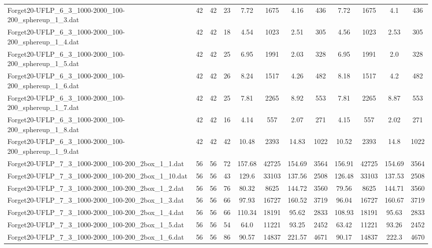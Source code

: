 \begin{sidewaystable}[!ht]
{\begin{tabular}{lccccccccccc}
Forget20-UFLP\_6\_3\_1000-2000\_100-200\_sphereup\_1\_3.dat & 42 & 42 & 23 & 7.72 & 1675 & 4.16 & 436 & 7.72 & 1675 &  \textcolor{blue2}{4.1} & 436 \\
Forget20-UFLP\_6\_3\_1000-2000\_100-200\_sphereup\_1\_4.dat & 42 & 42 & 18 & 4.54 & 1023 &  \textcolor{blue2}{2.51} & 305 & 4.56 & 1023 & 2.53 & 305 \\
Forget20-UFLP\_6\_3\_1000-2000\_100-200\_sphereup\_1\_5.dat & 42 & 42 & 25 & 6.95 & 1991 & 2.03 & 328 & 6.95 & 1991 &  \textcolor{blue2}{2.0} & 328 \\
Forget20-UFLP\_6\_3\_1000-2000\_100-200\_sphereup\_1\_6.dat & 42 & 42 & 26 & 8.24 & 1517 & 4.26 & 482 & 8.18 & 1517 &  \textcolor{blue2}{4.2} & 482 \\
Forget20-UFLP\_6\_3\_1000-2000\_100-200\_sphereup\_1\_7.dat & 42 & 42 & 25 &  \textcolor{blue2}{7.81} & 2265 & 8.92 & 553 &  \textcolor{blue2}{7.81} & 2265 & 8.87 & 553 \\
Forget20-UFLP\_6\_3\_1000-2000\_100-200\_sphereup\_1\_8.dat & 42 & 42 & 16 & 4.14 & 557 & 2.07 & 271 & 4.15 & 557 &  \textcolor{blue2}{2.02} & 271 \\
Forget20-UFLP\_6\_3\_1000-2000\_100-200\_sphereup\_1\_9.dat & 42 & 42 & 42 &  \textcolor{blue2}{10.48} & 2393 & 14.83 & 1022 & 10.52 & 2393 & 14.8 & 1022 \\
Forget20-UFLP\_7\_3\_1000-2000\_100-200\_2box\_1\_1.dat & 56 & 56 & 72 & 157.68 & 42725 &  \textcolor{blue2}{154.69} & 3564 & 156.91 & 42725 &  \textcolor{blue2}{154.69} & 3564 \\
Forget20-UFLP\_7\_3\_1000-2000\_100-200\_2box\_1\_10.dat & 56 & 56 & 43 & 129.6 & 33103 & 137.56 & 2508 &  \textcolor{blue2}{126.48} & 33103 & 137.53 & 2508 \\
Forget20-UFLP\_7\_3\_1000-2000\_100-200\_2box\_1\_2.dat & 56 & 56 & 76 & 80.32 & 8625 & 144.72 & 3560 & 79.56 & 8625 & 144.71 & 3560 \\
Forget20-UFLP\_7\_3\_1000-2000\_100-200\_2box\_1\_3.dat & 56 & 56 & 66 & 97.93 & 16727 & 160.52 & 3719 &  \textcolor{blue2}{96.04} & 16727 & 160.67 & 3719 \\
Forget20-UFLP\_7\_3\_1000-2000\_100-200\_2box\_1\_4.dat & 56 & 56 & 66 & 110.34 & 18191 & 95.62 & 2833 & 108.93 & 18191 & 95.63 & 2833 \\
Forget20-UFLP\_7\_3\_1000-2000\_100-200\_2box\_1\_5.dat & 56 & 56 & 54 & 64.0 & 11221 & 93.25 & 2452 & 63.42 & 11221 & 93.26 & 2452 \\
Forget20-UFLP\_7\_3\_1000-2000\_100-200\_2box\_1\_6.dat & 56 & 56 & 86 & 90.57 & 14837 & 221.57 & 4671 & 90.17 & 14837 & 222.3 & 4670 \\

\end{tabular}}
\end{sidewaystable}
